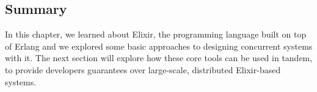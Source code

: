 \subsection{Summary}
In this chapter, we learned about Elixir, the programming language built on top of Erlang and we explored some basic approaches to designing concurrent systems with it. The next section will explore how these core tools can be used in tandem, to provide developers guarantees over large-scale, distributed Elixir-based systems.